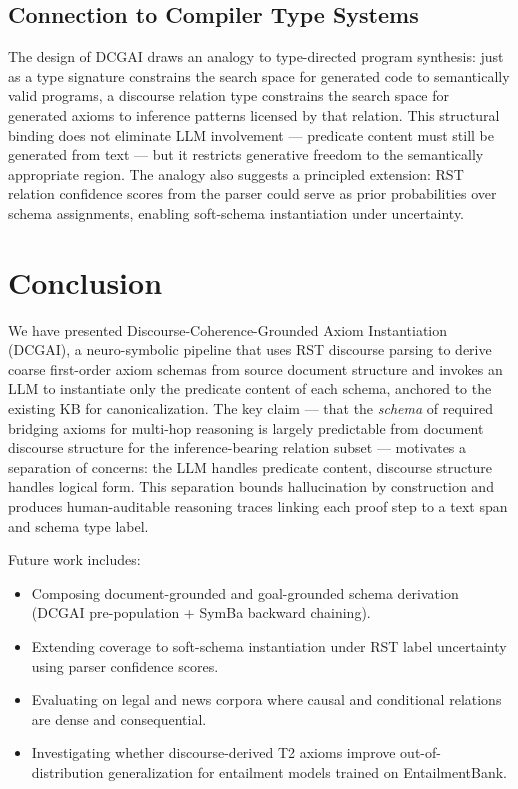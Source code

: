 \documentclass[11pt,letterpaper]{article}
\begin{document}
\subsection{Connection to Compiler Type Systems}

The design of DCGAI draws an analogy to type-directed program synthesis: just as a type signature constrains the
search space for generated code to semantically valid programs, a discourse relation type constrains the search
space for generated axioms to inference patterns licensed by that relation. This structural binding does not
eliminate LLM involvement --- predicate content must still be generated from text --- but it restricts generative
freedom to the semantically appropriate region. The analogy also suggests a principled extension: RST relation
confidence scores from the parser could serve as prior probabilities over schema assignments, enabling
soft-schema instantiation under uncertainty.

\section{Conclusion}

We have presented Discourse-Coherence-Grounded Axiom Instantiation (DCGAI), a neuro-symbolic pipeline that uses RST
discourse parsing to derive coarse first-order axiom schemas from source document structure and invokes an LLM to
instantiate only the predicate content of each schema, anchored to the existing KB for canonicalization. The key
claim --- that the \emph{schema} of required bridging axioms for multi-hop reasoning is largely predictable from
document discourse structure for the inference-bearing relation subset --- motivates a separation of concerns: the
LLM handles predicate content, discourse structure handles logical form. This separation bounds hallucination by
construction and produces human-auditable reasoning traces linking each proof step to a text span and schema type
label.

Future work includes:
\begin{itemize}
  \item Composing document-grounded and goal-grounded schema derivation (DCGAI pre-population + SymBa backward
    chaining).
  \item Extending coverage to soft-schema instantiation under RST label uncertainty using parser confidence scores.
  \item Evaluating on legal and news corpora where causal and conditional relations are dense and consequential.
  \item Investigating whether discourse-derived T2 axioms improve out-of-distribution generalization for entailment
    models trained on EntailmentBank.
\end{itemize}



\end{document}
